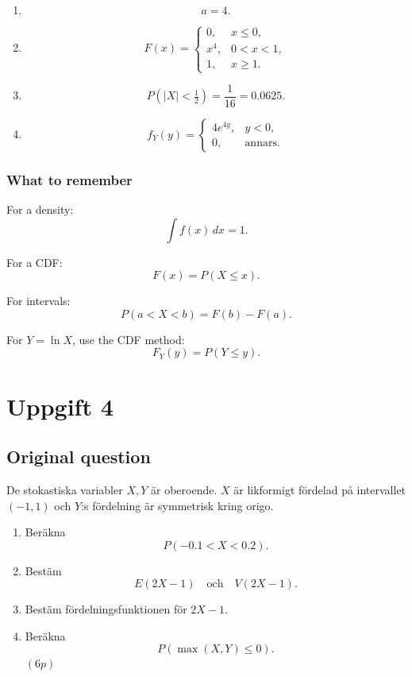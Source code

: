 \documentclass[10pt]{article}
\begin{document}
\begin{enumerate}[label=\alph*)]
\item
\[
a=4.
\]

\item
\[
F(x)=
\begin{cases}
0,
& x\le 0,\\
x^4,
& 0<x<1,\\
1,
& x\ge 1.
\end{cases}
\]

\item
\[
P(|X|<\tfrac12)
=
\frac{1}{16}
=0.0625.
\]

\item
\[
f_Y(y)=
\begin{cases}
4e^{4y},
& y<0,\\
0,
& \text{annars}.
\end{cases}
\]
\end{enumerate}

\subsubsection*{What to remember}

For a density:
\[
\int f(x)\,dx=1.
\]

For a CDF:
\[
F(x)=P(X\le x).
\]

For intervals:
\[
P(a<X<b)=F(b)-F(a).
\]

For \(Y=\ln X\), use the CDF method:
\[
F_Y(y)=P(Y\le y).
\]

\section*{Uppgift 4}

\subsection*{Original question}

De stokastiska variabler \(X,Y\) är oberoende.
\(X\) är likformigt fördelad på intervallet
\((-1,1)\) och \(Y\):s fördelning är symmetrisk
kring origo.

\begin{enumerate}[label=\alph*)]
\item Beräkna
\[
P(-0.1<X<0.2).
\]

\item Bestäm
\[
E(2X-1)
\quad\text{och}\quad
V(2X-1).
\]

\item Bestäm fördelningsfunktionen för \(2X-1\).

\item Beräkna
\[
P(\max(X,Y)\le 0).
\]
\((6p)\)
\end{enumerate}
\end{document}
